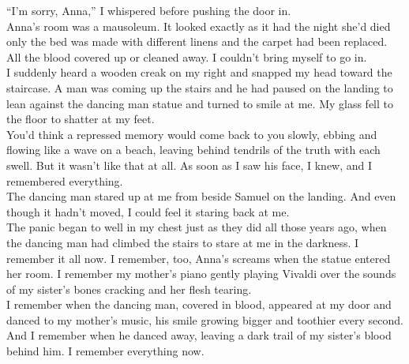 \documentclass[a5paper]{scrartcl}
\begin{document}
\enquote{I'm sorry, Anna,} I whispered before pushing the door in.\\


Anna's room was a mausoleum. It looked exactly as it had the night she'd died only the bed was made with different linens and the carpet had been replaced. All the blood covered up or cleaned away. I couldn't bring myself to go in.\\


I suddenly heard a wooden creak on my right and snapped my head toward the staircase. A man was coming up the stairs and he had paused on the landing to lean against the dancing man statue and turned to smile at me. My glass fell to the floor to shatter at my feet.\\


You'd think a repressed memory would come back to you slowly, ebbing and flowing like a wave on a beach, leaving behind tendrils of the truth with each swell. But it wasn't like that at all. As soon as I saw his face, I knew, and I remembered everything. \\


The dancing man stared up at me from beside Samuel on the landing. And even though it hadn't moved, I could feel it staring back at me. \\


The panic began to well in my chest just as they did all those years ago, when the dancing man had climbed the stairs to stare at me in the darkness.  I remember it all now. I remember, too, Anna's screams when the statue entered her room. I remember my mother's piano gently playing Vivaldi over the sounds of my sister's bones cracking and her flesh tearing. \\


I remember when the dancing man, covered in blood, appeared at my door and danced to my mother's music, his smile growing bigger and toothier every second. And I remember when he danced away, leaving a dark trail of my sister's blood behind him. I remember everything now.  \\
\end{document}
